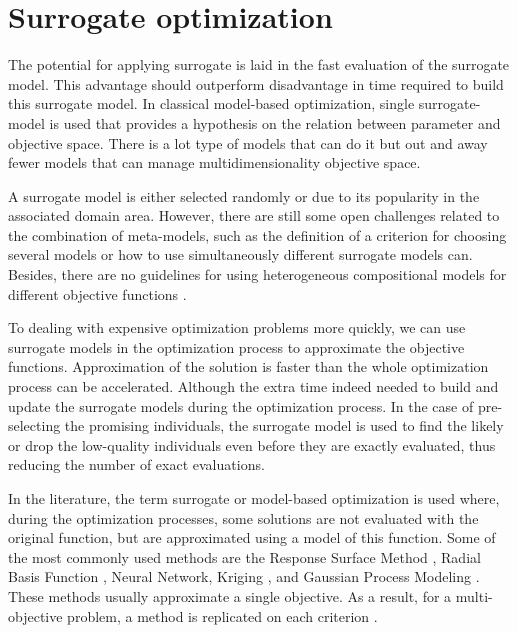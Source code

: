     \section{Surrogate optimization} 

        The potential for applying surrogate is laid in the fast evaluation of the surrogate model. This advantage should outperform disadvantage in time required to build this surrogate model. In classical model-based optimization, single surrogate-model is used that provides a hypothesis on the relation between parameter and objective space. There is a lot type of models that can do it but out and away fewer models that can manage multidimensionality objective space.

        A surrogate model is either selected randomly or due to its popularity in the associated domain area.  However, there are still some open challenges related to the combination of meta-models, such as the definition of a criterion for choosing several models or how to use simultaneously different surrogate models can. Besides, there are no guidelines for using heterogeneous compositional models for different objective functions \cite{SoftSurvey}.

        \cite{EngSurMod} 

        To dealing with expensive optimization problems more quickly, we can use surrogate models in the optimization process to approximate the objective functions. Approximation of the solution is faster than the whole optimization process can be accelerated. Although the extra time indeed needed to build and update the surrogate models during the optimization process. 
        In the case of pre-selecting the promising individuals, the surrogate model is used to find the likely or drop the low-quality individuals even before they are exactly evaluated, thus reducing the number of exact evaluations.

        In the literature, the term surrogate or model-based optimization is used where, during the optimization processes, some solutions are not evaluated with the original function, but are approximated using a model of this function. Some of the most commonly used methods are the Response Surface Method \cite{ResponseSurface}, Radial Basis Function \cite{Rasmussen2004}, Neural Network, Kriging \cite{Woodard00}, and Gaussian Process Modeling \cite{RasmussenN10, RasmussenW06}. These methods usually approximate a single objective. As a result, for a multi-objective problem, a method is replicated on each criterion \cite{Knowles06, nardi2019practical}.


